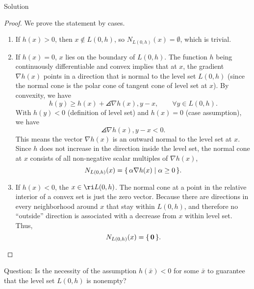 \documentclass{article}
\begin{document}
\begin{solution}
    {Solution}
    \begin{proof}
        We prove the statement by cases.
        \begin{enumerate}
            \item If $h(x)>0$, then $x\notin L(0,h)$, so $N_{L(0,h)}(x)=\emptyset$, which is trivial.
            \item If $h(x)=0$, $x$ lies on the boundary of $L(0, h)$. The function $h$ being continuously differentiable and convex implies that at $x$, the gradient $\nabla h(x)$ points in a direction that is normal to the level set $L(0, h)$ (since the normal cone is the polar cone of tangent cone of level set at $x$). By convexity, we have \[h(y)\geq h(x)+\angles{\nabla h(x), y-x}, \qquad \forall y\in L(0, h).\] With $h(y)<0$ (definition of level set) and $h(x)=0$ (case assumption), we have \[\angles{\nabla h(x), y-x}<0.\] This means the vector $\nabla h(x)$ is an outward normal to the level set at $x$. Since $h$ does not increase in the direction inside the level set, the normal cone at $x$ consists of all non-negative scalar multiples of $\nabla h(x)$, \ie \[N_{L(0,h)}(x)=\set{\alpha\nabla h(x)\mid \alpha\geq 0}.\]
            \item If $h(x)<0$, the $x\in\ri L(0, h)$. The normal cone at a point in the relative interior of a convex set is just the zero vector. Because there are directions in every neighborhood around $x$ that stay within $L(0, h)$, and therefore no ``outside'' direction is associated with a decrease from $x$ within level set. Thus, \[N_{L(0,h)}(x)=\set{\bm{0}}.\]
        \end{enumerate}
    \end{proof}
    Question: Is the necessity of the assumption $h(\bar{x})<0$ for some $\bar{x}$ to guarantee that the level set $L(0,h)$ is nonempty?
\end{solution}
\end{document}
